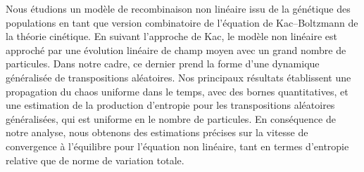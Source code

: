 \begin{abstract}
We study a nonlinear recombination model from population genetics as a combinatorial version of the Kac--Boltzmann equation from kinetic theory. Following Kac's approach, the nonlinear model is approximated by a mean field linear evolution with a large number of particles. In our setting, the latter takes the form of a generalized random transposition dynamics. Our main results establish a uniform in time propagation of chaos with quantitative bounds, and a tight entropy production estimate for the generalized random transpositions, which holds uniformly in the number of particles. As a byproduct of our analysis we obtain sharp estimates on the speed of convergence to stationarity for the nonlinear equation, both in terms of relative entropy and total variation norm.
\end{abstract}

\begin{altabstract}
Nous étudions un modèle de recombinaison non linéaire issu de la génétique des populations en tant que version combinatoire de l'équation de Kac--Boltzmann de la théorie cinétique. En suivant l'approche de Kac, le modèle non linéaire est approché par une évolution linéaire de champ moyen avec un grand nombre de particules. Dans notre cadre, ce dernier prend la forme d'une dynamique généralisée de transpositions aléatoires. Nos principaux résultats établissent une propagation du chaos uniforme dans le temps, avec des bornes quantitatives, et une estimation de la production d'entropie pour les transpositions aléatoires généralisées, qui est uniforme en le nombre de particules. En conséquence de notre analyse, nous obtenons des estimations précises sur la vitesse de convergence à l'équilibre pour l'équation non linéaire, tant en termes d'entropie relative que de norme de variation totale.
\end{altabstract}


